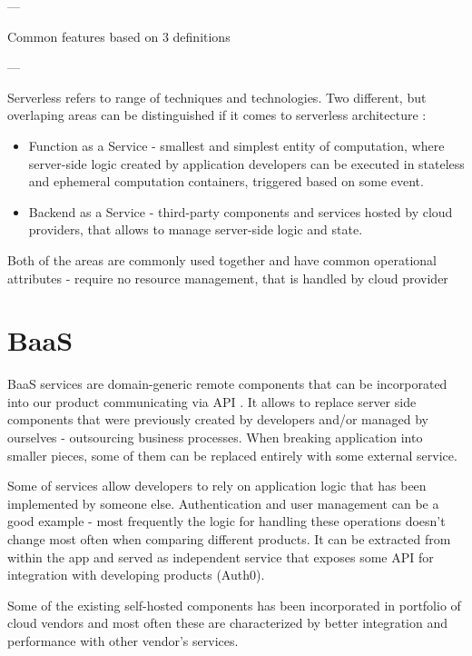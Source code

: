 
---

Common features based on 3 definitions

---



Serverless refers to range of techniques and technologies. Two different, but overlaping areas can be distinguished if it comes to serverless architecture \cite{MartinFowler}:

\begin{itemize}
    \item Function as a Service - smallest and simplest entity of computation, where server-side logic created by application developers can be executed in stateless and ephemeral computation containers, triggered based on some event.
    \item Backend as a Service - third-party components and services hosted by cloud providers, that allows to manage server-side logic and state.    
\end{itemize}

\noindent Both of the areas are commonly used together and have common operational attributes - require no resource management, that is handled by cloud provider

\section*{BaaS}

BaaS services are domain-generic remote components that can be incorporated into our product communicating via API \cite{RobertsChapin2017}. It allows to replace server side components that were previously created by developers and/or managed by ourselves - outsourcing business processes. When breaking application into smaller pieces, some of them can be replaced entirely with some external service.

Some of services allow developers to rely on application logic that has been implemented by someone else. Authentication and user management can be a good example - most frequently the logic for handling these operations doesn't change most often when comparing different products. It can be extracted from within the app and served as independent service that exposes some API for integration with developing products (Auth0).

Some of the existing self-hosted components has been incorporated in portfolio of cloud vendors and most often these are characterized by better integration and performance with other vendor's services.

